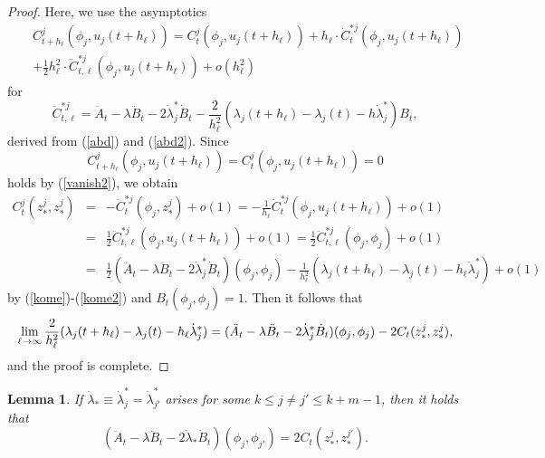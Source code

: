 \documentclass[final,a4paper]{jmsj}
\theoremstyle{thmstyleone}%
\theoremstyle{thmstyletwo}%
\theoremstyle{thmstylethree}%
\newtheorem{lemma}[theorem]{Lemma}
\begin{document}
\begin{proof}
Here, we use the asymptotics  
\begin{eqnarray*} 
& & C_{t+h_\ell}^j(\phi_j, u_j(t+h_\ell)) = C_{t}^j(\phi_j, u_j(t+h_\ell))+h_\ell\cdot\dot C_{t}^{\ast j}(\phi_j, u_j(t+h_\ell)) \\ 
& & +\frac{1}{2}h_\ell^2\cdot\ddot C_{t,\ell}^{\ast j}(\phi_j, u_j(t+h_\ell))+o(h_\ell^2) 
\end{eqnarray*} 
for  
\begin{equation} 
\ddot C_{t,\ell}^{\ast j}=\ddot A_t-\lambda \ddot B_t-2\dot \lambda_j^\ast\dot B_t-\frac{2}{h_\ell^2}(\lambda_j(t+h_\ell)-\lambda_j(t)-h\dot \lambda_j^\ast)B_t, 
 \label{kome3}
\end{equation} 
derived from (\ref{abd}) and (\ref{abd2}). Since 
\[ C_{t+h_\ell}^j(\phi_j, u_j(t+h_\ell))=C_t^j(\phi_j, u_j(t+h_\ell))=0 \] 
holds by (\ref{vanish2}), we obtain 
\begin{eqnarray*} 
C_t^j(z_\ast^j, z_\ast^j) & = & - \dot C_{t}^{\ast j}(\phi_j, z_\ast^j)+o(1)=-\frac{1}{h_\ell}\dot C_{t}^{\ast j}(\phi_j, u_j(t+h_\ell))+o(1) \\ 
& = & \frac{1}{2}\ddot C_{t,\ell}^{\ast j}(\phi_j, u_j(t+h_\ell))+o(1) = \frac{1}{2}\ddot C_{t,\ell}^{\ast j}(\phi_j, \phi_j)+o(1) \\ 
& = & \frac{1}{2}(\ddot A_t-\lambda \ddot B_t-2\dot \lambda_j^\ast\dot B_t)(\phi_j, \phi_j) -\frac{1}{h_\ell^2}(\lambda_j(t+h_\ell)-\lambda_j(t)-h_\ell\dot \lambda_j^\ast)+o(1) 
\end{eqnarray*} 
by (\ref{kome})-(\ref{kome2}) and $B_t(\phi_j, \phi_j)=1$. Then it follows that   
\[ 
\lim_{\ell\rightarrow \infty}\frac{2}{h_\ell^2}(\lambda_j(t+h_\ell)-\lambda_j(t)-h_\ell\dot \lambda_j^\ast) \\ 
=(\ddot A_t-\lambda\ddot B_t-2\dot\lambda_j^\ast\dot B_t)(\phi_j, \phi_j)-2C_t(z_\ast^j, z_\ast^j),   
\]  
and the proof is complete. 
\end{proof} 

\begin{lemma}\label{lem13}
If 
$\dot\lambda_\ast\equiv \dot \lambda_j^\ast=\dot \lambda_{j'}^\ast$ arises for some $k\leq j\neq j'\leq k+m-1$, 
then it holds that 
\[ (\ddot A_t-\lambda\ddot B_t-2\dot\lambda_\ast \dot B_t)(\phi_j, \phi_{j'})=2C_t(z_\ast^j, z_\ast^{j'}). \] 
\end{lemma} 
\end{document}
